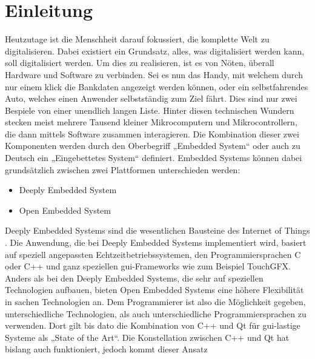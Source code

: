 \chapter{Einleitung}
\label{chap:einleitung}
Heutzutage ist die Menschheit darauf fokussiert, die komplette Welt zu digitalisieren. Dabei
existiert ein Grundsatz, alles, was digitalisiert werden kann, soll digitalisiert werden. Um dies
zu realisieren, ist es von Nöten, überall Hardware und Software zu verbinden. Sei es nun das
Handy, mit welchem durch nur einem klick die Bankdaten angezeigt werden können, oder ein
selbstfahrendes Auto, welches einen Anwender selbstständig zum Ziel fährt. Dies sind nur zwei
Bespiele von einer unendlich langen Liste. Hinter diesen technischen Wundern stecken meist
mehrere Tausend kleiner Mikrocomputern und Mikrocontrollern, die dann mittels Software zusammen
interagieren. Die Kombination dieser zwei Komponenten werden durch den Oberbegriff „Embedded
System“ oder auch zu Deutsch ein „Eingebettetes System“ definiert.
\newline
\newline
Embedded Systems können dabei grundsätzlich zwischen zwei Plattformen unterschieden werden:
\begin{itemize}
    \item Deeply Embedded System
    \item Open Embedded System
\end{itemize}
\newline
\newline
Deeply Embedded Systems sind die wesentlichen Bausteine des Internet of Things
\cite{HochschuleniederrheimDeeply}. Die Anwendung,
die bei Deeply Embedded Systems implementiert wird, basiert auf speziell angepassten
Echtzeitbetriebssystemen, den Programmiersprachen C oder C++ und ganz speziellen
\ac{gui}-Frameworks wie zum Beispiel TouchGFX.
\newline
\newline
Anders als bei den Deeply Embedded Systems, die sehr auf speziellen Technologien aufbauen, bieten
Open Embedded Systems eine höhere Flexibilität in sachen Technologien an. Dem Programmierer ist
also die Möglichkeit gegeben, unterschiedliche Technologien, als auch unterschiedliche
Programmiersprachen zu verwenden. Dort gilt bis dato die Kombination von C++ und Qt für
\ac{gui}-lastige Systeme als „State of the Art“.
\newline
\newline
Die Konstellation zwischen C++ und Qt hat bislang auch funktioniert, jedoch kommt dieser Ansatz
